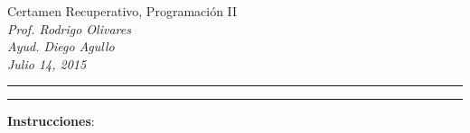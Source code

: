 \documentclass[10pt]{article}
\begin{document}
\begin{center}
    {\Large Certamen Recuperativo, Programaci\'on II} \\
    \emph{\small Prof. Rodrigo Olivares} \\
    \emph{\small Ayud. Diego Agullo} \\
    \emph{\scriptsize Julio 14, 2015}
\end{center}
\vspace*{-35pt}
\begin{center}
    \rule{1\textwidth}{.3pt}
\end{center}
\vspace*{-42pt}
\begin{center}
    \rule{1\textwidth}{2pt}
\end{center}

\vspace*{-15pt}
{\small \textbf{Instrucciones}:}
\vspace*{-15pt}
\end{document}
